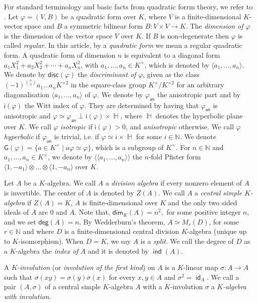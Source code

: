 \documentclass[twoside,11pt]{amsart}
\numberwithin{equation}{section}
\theoremstyle{definition}
\renewcommand{\dim}{\operatorname{\mathsf{dim}}}
\renewcommand{\deg}{\operatorname{\mathsf{deg}}}
\newcommand\ind{\operatorname{\mathsf{ind}}}
\newcommand\id{\operatorname{\mathsf{id}}}
\newcommand\hh{\operatorname{\mathbb{H}}}
\newcommand{\vf}{\varphi}
\newcommand{\mg}[1]{{#1}^{\times}}
\newcommand{\sq}[1]{{#1}^{\times 2}}
\newcommand{\scg}[1]{\mg{#1}/\sq{#1}}
\newcommand{\s}{\sigma}
\newcommand{\nat}{\mathbb{N}}
\newcommand{\la}{\langle}
\newcommand{\ra}{\rangle}
\newcommand{\lla}{\la\!\la}
\newcommand{\rra}{\ra\!\ra}
\newcommand{\an}{\mathsf{an}}
\newcommand{\disc}{\mathsf{disc}}
\newcommand{\G}{\mathsf{G}}
\renewcommand{\deg}{\mathsf{deg}}
\renewcommand{\dim}{\mathsf{dim}}
\newcommand{\wi}{\mathsf{i}}
\begin{document}
For standard terminology and basic facts from quadratic forrm theory, we refer to \cite{Lam05}. Let $\vf = (V, B)$ be a quadratic form over $K$, where $V$ is a finite-dimensional $K$-vector space and $B$ a symmetric bilinear form $B:V\times V \rightarrow K$.   
The \emph{dimension of $\vf$} is the dimension of the vector space $V$ over $K$.
If $B$ is non-degenerate then $\vf$ is called {\it regular}. In this article, by a \emph{quadratic form} we mean a regular quadratic form. A quadratic form of dimension $n$ is equivalent to a diagonal form $a_1 X_1^2 + a_2 X_2^2 + \cdots + a_n X_n^2$, 
with $a_1,\dots,a_n \in \mg{K}$, which is denoted by $\langle a_1, \dots , a_n \rangle$. We denote by $\disc(\vf)$ the \emph{discriminant of $\vf$}, given as the class $(-1)^{\binom{n}{2}}a_1\dots a_n\sq{K}$ in the square-class group $\scg{K}$ for an arbitrary diagonalisation $\la a_1,\dots,a_n\ra$ of $\vf$.
We denote by $\vf_\an$ the anisotropic part and by $\wi(\vf)$ the Witt index of $\vf$.
They are determined by having that $\vf_\an$ is anisotropic and 
$\vf\simeq \vf_\an\perp \wi(\vf)\times \hh$, where $\hh$ denotes the hyperbolic plane over $K$.
We call $\vf$ \emph{isotropic} if $\wi(\vf)>0$, and \emph{anisotropic} otherwise.
We call $\vf$ \emph{hyperbolic} if $\vf_\an$ is trivial, i.e. if $\vf\simeq i\times \hh$ for some $i\in\nat$.  
We denote $\G(\vf)=\{a\in\mg{K}\mid a\vf\simeq \vf\}$, which is a subgroup of $\mg{K}$.
For $n\in\nat$ and $a_1,\dots,a_n\in\mg{K}$, we denote by $\lla a_1,\dots,a_n\rra$ the $n$-fold Pfister form $\la 1,-a_1\ra\otimes\dots\otimes\la 1,-a_n\ra$ over $K$.



Let $A$ be a $K$-algebra. 
We call $A$ a \emph{division algebra} if every nonzero element of $A$ is invertible. 
The center of $A$ is denoted by $Z(A)$. We call $A$ a \emph{central simple $K$-algebra} if $Z(A)=K$, $A$ is finite-dimensional over $K$ and the only two sided ideals of $A$ are $0$ and $A$. Note that, $\dim_{K}(A)=n^2,$ for some positive integer $n$, and we set $\deg(A)=n$. By Wedderburn's theorem, $A\simeq M_r(D)$, for some $r\in \nat$ and where $D$ is a finite-dimensional central division $K$-algebra (unique up to $K$-isomorphism). When $D=K$, we say $A$ is a \emph{split}. We call the degree of $D$ as a $K$-algebra the {\it index of} $A$ and it is denoted by $\ind(A)$. 

A \emph{$K$-involution} (or \emph{involution of the first kind}) on $A$ is a $K$-linear map $\sigma:A\rightarrow A$  such that $\s(xy)=\s(y)\s(x)$ for every $x,y\in A$ and $\s^2=\id_A$.
We call a pair $(A,\s)$ of a central simple $K$-algebra $A$ with a $K$-involution $\s$ a \emph{$K$-algebra with involution}.
\end{document}

